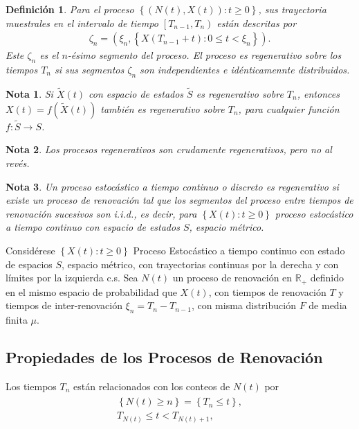 \documentclass{article}
\newtheorem{Def}{Definición}[section]
\newtheorem{Note}{Nota}[section]
\newcommand{\rea}{\mathbb{R}}
\numberwithin{equation}{section}
\begin{document}
\begin{Def}
Para el proceso $\left\{\left(N\left(t\right),X\left(t\right)\right):t\geq0\right\}$, sus trayectoria muestrales en el intervalo de tiempo $\left[T_{n-1},T_{n}\right)$ est\'an descritas por
\begin{eqnarray*}
\zeta_{n}=\left(\xi_{n},\left\{X\left(T_{n-1}+t\right):0\leq t<\xi_{n}\right\}\right).
\end{eqnarray*}
Este $\zeta_{n}$ es el $n$-\'esimo segmento del proceso. El proceso es regenerativo sobre los tiempos $T_{n}$ si sus segmentos $\zeta_{n}$ son independientes e id\'enticamennte distribuidos.
\end{Def}


\begin{Note}
Si $\tilde{X}\left(t\right)$ con espacio de estados $\tilde{S}$ es regenerativo sobre $T_{n}$, entonces $X\left(t\right)=f\left(\tilde{X}\left(t\right)\right)$ tambi\'en es regenerativo sobre $T_{n}$, para cualquier funci\'on $f:\tilde{S}\rightarrow S$.
\end{Note}

\begin{Note}
Los procesos regenerativos son crudamente regenerativos, pero no al rev\'es.
\end{Note}


\begin{Note}\label{Procesos.Regenerativo.Clasico}
Un proceso estoc\'astico a tiempo continuo o discreto es regenerativo si existe un proceso de renovaci\'on  tal que los segmentos del proceso entre tiempos de renovaci\'on sucesivos son i.i.d., es decir, para $\left\{X\left(t\right):t\geq0\right\}$ proceso estoc\'astico a tiempo continuo con espacio de estados $S$, espacio m\'etrico.
\end{Note}

Consid\'erese $\left\{X\left(t\right):t\geq0\right\}$ Proceso Estoc\'astico a tiempo continuo con estado de espacios $S$, espacio m\'etrico, con trayectorias continuas por la derecha y con l\'imites por la izquierda c.s. Sea $N\left(t\right)$ un proceso de renovaci\'on en $\rea_{+}$ definido en el mismo espacio de probabilidad que $X\left(t\right)$, con tiempos de renovaci\'on $T$ y tiempos de inter-renovaci\'on $\xi_{n}=T_{n}-T_{n-1}$, con misma distribuci\'on $F$ de media finita $\mu$.



\subsection{Propiedades de los Procesos de Renovaci\'on}
Los tiempos $T_{n}$ est\'an relacionados con los conteos de $N\left(t\right)$ por
\begin{eqnarray}
\begin{array}{l}
\left\{N\left(t\right)\geq n\right\}=\left\{T_{n}\leq t\right\},\\
T_{N\left(t\right)}\leq t<T_{N\left(t\right)+1},
\end{array}
\end{eqnarray}
\end{document}
